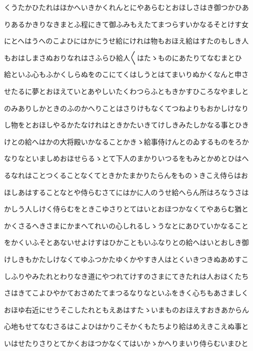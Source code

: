 \documentclass[a4paper,11pt,landscape]{ltjtarticle}
\begin{document}
\par\medskip
くうたかひたれはほかへいきかくれんとにやあらむとおほしさはき御つかひあ
\par\medskip
りあるかきりなきまとふ程にきて御ふみもえたてまつらすいかなるそとけす女
\par\medskip
にとへはうへのこよひにはかにうせ給にけれは物もおほえ給はすたのもしき人
\par\medskip
もおはしまさぬおりなれはさふらひ給人〱はたゝものにあたりてなむまとひ
\par\medskip
給といふ心もふかくしらぬをのこにてくはしうとはてまいりぬかくなんと申さ
\par\medskip
せたるに夢とおほえていとあやしいたくわつらふともきかすひころなやましと
\par\medskip
のみありしかときのふのかへりことはさりけもなくてつねよりもおかしけなり
\par\medskip
し物をとおほしやるかたなけれはときかたいきてけしきみたしかなる事とひき
\par\medskip
けとの給へはかの大将殿いかなることかきゝ給事侍けんとのゐするものをろか
\par\medskip
なりなといましめおほせらるゝとて下人のまかりいつるをもみとかめとひはへ
\par\medskip
るなれはことつくることなくてときかたまかりたらんをものゝきこえ侍らはお
\par\medskip
ほしあはすることなとや侍らむさてにはかに人のうせ給へらん所はろなうさは
\par\medskip
かしう人しけく侍らむをときこゆさりとてはいとおほつかなくてやあらむ猶と
\par\medskip
かくさるへきさまにかまへてれいの心しれるしゝうなとにあひていかなること
\par\medskip
をかくいふそとあないせよけすはひかこともいふなりとの給へはいとおしき御
\par\medskip
けしきもかたしけなくてゆふつかたゆくかやすき人はとくいきつきぬあめすこ
\par\medskip
しふりやみたれとわりなき道にやつれてけすのさまにてきたれは人おほくたち
\par\medskip
さはきてこよひやかておさめたてまつるなりなといふをきく心ちもあさましく
\par\medskip
おほゆ右近にせうそこしたれともえあはすたゝいまものおほえすおきあからん
\par\medskip
心地もせてなむさるはこよひはかりこそかくもたちより給はめえきこえぬ事と
\par\medskip
いはせたりさりとてかくおほつかなくてはいかゝかへりまいり侍らむいまひと
\end{document}

